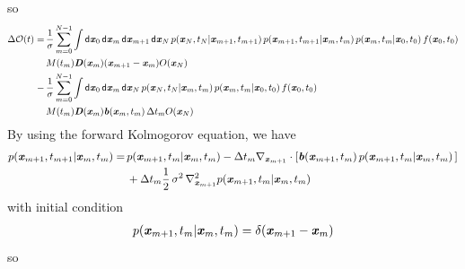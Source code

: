 \documentclass[aip,jcp,a4paper,reprint,onecolumn]{revtex4-1}
\newcommand{\vect}[1]{\textbf{\textit{#1}}}
\newcommand{\dd}{\textsf{d}}
\newcommand{\mo}{\mathcal O}
\begin{document}
so
\begin{align}\nonumber
  \Delta\mo (t) = &\,
  \frac1\sigma
  \sum_{m=0}^{N-1}
  \int \dd \vect x_0\,
  \dd \vect x_m\,
  \dd \vect x_{m+1}\,
  \dd \vect x_N\,
  p(\vect x_N,t_N | \vect x_{m+1}, t_{m+1})\,
  p(\vect x_{m+1}, t_{m+1} | \vect x_{m}, t_{m})\,
  p(\vect x_{m}, t_{m} | \vect x_{0}, t_{0})\,
  f(\vect x_0, t_0)
  \\ \nonumber
  &\,
  M(t_m) \vect D(\vect x_m) (\vect x_{m+1} - \vect x_{m})  
  O(\vect x_N)\\
  -
  &\,
  \frac1\sigma
  \sum_{m=0}^{N-1}
  \int \dd \vect x_0\,
  \dd \vect x_m\,
  \dd \vect x_N\,
  p(\vect x_N,t_N | \vect x_{m}, t_{m})\,
  p(\vect x_{m}, t_{m} | \vect x_{0}, t_{0}) \,
  f(\vect x_0, t_0)\\
  &\,
  M(t_m) \vect D(\vect x_m) \vect b(\vect x_m, t_m)\,\Delta t_m
  O(\vect x_N)
\end{align}
By using the forward Kolmogorov equation, we have
\begin{align}\nonumber
  p(\vect x_{m+1},t_{m+1} | \vect x_{m},t_{m} )
  = &\,
  p(\vect x_{m+1},t_{m} | \vect x_{m},t_{m} )
  -
  \Delta t_m
  \nabla_{\vect x_{m+1}}
  \cdot
  [ \vect b(\vect x_{m+1}, t_m)\,
  p(\vect x_{m+1},t_{m} | \vect x_{m},t_{m} )\,]\\
  &\,
  +
  \Delta t_m \frac{1} 2\,\sigma^2\,
  \nabla_{\vect x_{m+1}}^2 p(\vect x_{m+1},t_{m} | \vect x_{m},t_{m} )
\end{align}
with initial condition
\begin{align}
  p(\vect x_{m+1},t_{m} | \vect x_{m},t_{m} ) =
  \delta (\vect x_{m+1} - \vect x_{m})
\end{align}
so
\end{document}
